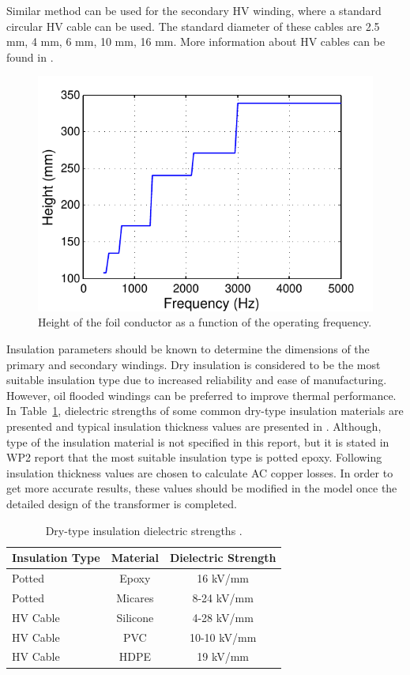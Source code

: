 \documentclass[a4paper, 11pt]{article} %
\begin{document}
Similar method can be used for the secondary HV winding, where a standard circular HV cable can be used. The standard diameter of these cables are 2.5 mm, 4 mm, 6 mm, 10 mm, 16 mm. More information about HV cables can be found in \cite{HVcable}.


\begin{figure}[]
  \centering
    \includegraphics[]{primary_height}
  \caption{Height of the foil conductor as a function of the operating frequency.}
  \label{primary_height}
\end{figure}

Insulation parameters should be known to determine the dimensions of the primary and secondary windings. Dry insulation is considered to be the most suitable insulation type due to increased reliability and ease of manufacturing. However, oil flooded windings can be preferred to improve thermal performance.  In Table~\ref{dielectric}, dielectric strengths of some common dry-type insulation materials are presented and typical insulation thickness values are presented in \cite{Ortiz2010}. Although, type of the insulation material is not specified in this report, but it is stated in WP2 report that the most suitable insulation type is potted epoxy. Following insulation thickness values are chosen to calculate AC copper losses. In order to get more accurate results, these values should be modified in the model once the detailed design of the transformer is completed.

\begin{table}[]
\begin{center}
\begin{tabular}{lcc}
Insulation Type & Material & Dielectric Strength\\
\hline
Potted & Epoxy & 16 kV/mm\\
Potted & Micares & 8-24 kV/mm \\
HV Cable & Silicone & 4-28 kV/mm\\
HV Cable & PVC & 10-10 kV/mm\\
HV Cable & HDPE & 19 kV/mm \\
\hline
\end{tabular} 
\end{center}
\caption{Dry-type insulation dielectric strengths \cite{Ortiz2010}.}
\label{dielectric}
\end{table}
\end{document}
